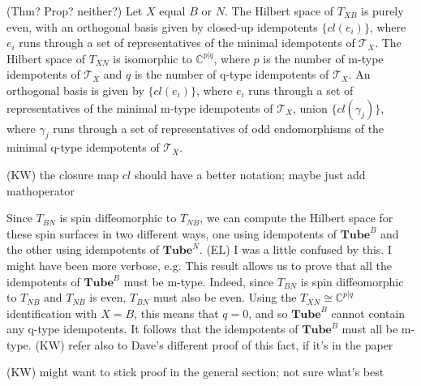\documentclass[12pt,a4paper]{article}
\newcommand{\cc}{\mathbb{C}}
\newcommand{\mct}{\mathcal{T}}
\newcommand{\tube}{\textbf{Tube}}
\newcommand{\kw}[1]{{\color{kwcolor}\footnotesize{(KW) #1}}}
\newcommand{\ethan}[1]{{\color{amethyst}\footnotesize{(EL) #1}}}
\begin{document}
(Thm? Prop? neither?) Let $X$ equal $B$ or $N$.
The Hilbert space of $T_{XB}$ is purely even, with an orthogonal basis given by closed-up idempotents $\{cl(e_i)\}$,
where $e_i$ runs through a set of representatives of the minimal idempotents of $\mct_X$.
The Hilbert space of $T_{XN}$ is isomorphic to $\cc^{p|q}$, where $p$ is the number of m-type idempotents of $\mct_X$
and $q$ is the number of q-type idempotents of $\mct_X$.
An orthogonal basis is given by $\{cl(e_i)\}$, where $e_i$ runs through a set of representatives of the minimal m-type idempotents of $\mct_X$,
union $\{cl(\gamma_j)\}$,
where $\gamma_j$ runs through a set of representatives of odd endomorphisms of the minimal q-type idempotents of $\mct_X$.

\kw{the closure map $cl$ should have a better notation; maybe just add mathoperator}

Since $T_{BN}$ is spin diffeomorphic to $T_{NB}$, we can compute the Hilbert space for these spin surfaces in two different ways, one using
idempotents of $\tube^B$ and the other using idempotents of $\tube^N$.
\ethan{I was a little confused by this. I might have been more verbose, e.g.}
This result allows us to prove that all the idempotents of $\tube^B$ must be m-type.
Indeed, since $T_{BN}$ is spin diffeomorphic to $T_{NB}$ and $T_{NB}$ is even, $T_{BN}$ must also be even.
Using the $T_{XN}\cong\cc^{p|q}$ identification with $X=B$, this means that $q=0$, and so $\tube^B$ cannot contain any q-type idempotents. 
It follows that the idempotents of $\tube^B$ must all be m-type.
\kw{refer also to Dave's different proof of this fact, if it's in the paper}

\kw{might want to stick proof in the general section; not sure what's best}
\end{document}
